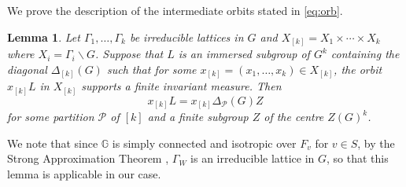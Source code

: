 \documentclass[11pt,reqno,a4paper]{amsart}
\numberwithin{equation}{section}
\newcommand{\bG}{\mathbb{G}}
\theoremstyle{theorem}
\newtheorem{lemma}[theorem]{Lemma}
\theoremstyle{definition}
\begin{document}
We prove the description of the intermediate orbits stated in \eqref{eq:orb}.

\begin{lemma}
	\label{l:subgroup}
	Let $\Gamma_1,\ldots,\Gamma_k$ be irreducible lattices in $G$ and
	$X_{[k]}=X_1\times \cdots \times X_k$ where $X_i=\Gamma_i\backslash G$.
	Suppose that $L$ is an immersed subgroup of $G^k$ containing 
	the diagonal $\Delta_{[k]}(G)$
	such that for some $x_{[k]}=(x_1,\ldots,x_k)\in X_{[k]}$, 
	the orbit 
	$x_{[k]} L$ in $X_{[k]}$ supports a finite invariant measure. Then
	$$
	 x_{[k]} L=x_{[k]}\Delta_{\mathcal{P}}(G)Z
	$$
	for some partition 	$\mathcal{P}$ of $[k]$ and a finite subgroup $Z$ of the centre $Z(G)^{k}$.
\end{lemma}

We note that since $\bG$ is simply connected and isotropic over $F_v$ for $v\in S$, by the Strong Approximation Theorem \cite[\S7.4]{PR}, $\Gamma_W$ is an irreducible lattice in $G$, so that this lemma is applicable in our case.
\end{document}
